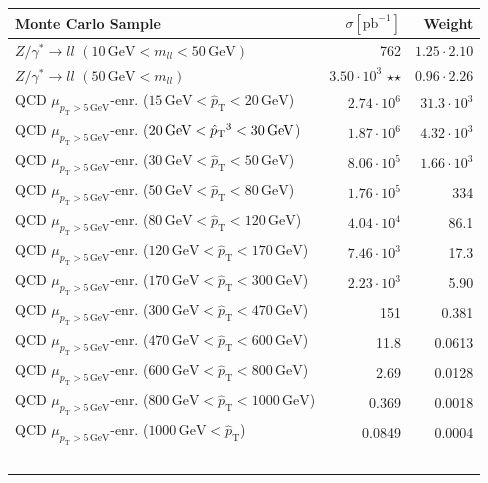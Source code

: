 \begin{table}[htbp!]
  \centering
  \begin{tabular}{|l|r|r|}
\hline
Monte Carlo Sample & $\sigma [\text{pb}^{-1}]$ & Weight \\
\hline
\hline
$Z/\gamma^* \rightarrow ll$ $(10\,\text{GeV} < m_{ll} < 50\,\text{GeV})$ & 762 & $1.25 \cdot 2.10$ \\
$Z/\gamma^* \rightarrow ll$ $(50\,\text{GeV} < m_{ll})$ & $3.50 \cdot 10^3$ $\star$$\star$ & $0.96 \cdot 2.26$ \\
\hline
QCD $\mu_{p_\text{T} > 5\,\text{GeV}}$-enr. ($15\,\text{GeV} < \hat{p}_{\text{T}} < 20\,\text{GeV}$) & $2.74 \cdot 10^6$ & $31.3 \cdot 10^3$ \\
QCD $\mu_{p_\text{T} > 5\,\text{GeV}}$-enr. ($20\,\text{GeV} < \hat{p}_{\text{T}}\footnotemark[3] < 30\,\text{GeV}$) & $1.87 \cdot 10^6$ & $4.32 \cdot 10^3$ \\
QCD $\mu_{p_\text{T} > 5\,\text{GeV}}$-enr. ($30\,\text{GeV} < \hat{p}_{\text{T}} < 50\,\text{GeV}$) & $8.06 \cdot 10^5$ & $1.66 \cdot 10^3$ \\
QCD $\mu_{p_\text{T} > 5\,\text{GeV}}$-enr. ($50\,\text{GeV} < \hat{p}_{\text{T}} < 80\,\text{GeV}$) & $1.76 \cdot 10^5$ & 334 \\
QCD $\mu_{p_\text{T} > 5\,\text{GeV}}$-enr. ($80\,\text{GeV} < \hat{p}_{\text{T}} < 120\,\text{GeV}$) & $4.04 \cdot 10^4$ & 86.1 \\
QCD $\mu_{p_\text{T} > 5\,\text{GeV}}$-enr. ($120\,\text{GeV} < \hat{p}_{\text{T}} < 170\,\text{GeV}$) & $7.46 \cdot 10^3$ & 17.3 \\
QCD $\mu_{p_\text{T} > 5\,\text{GeV}}$-enr. ($170\,\text{GeV} < \hat{p}_{\text{T}} < 300\,\text{GeV}$) & $2.23 \cdot 10^3$ & 5.90 \\
QCD $\mu_{p_\text{T} > 5\,\text{GeV}}$-enr. ($300\,\text{GeV} < \hat{p}_{\text{T}} < 470\,\text{GeV}$) & 151 & 0.381 \\
QCD $\mu_{p_\text{T} > 5\,\text{GeV}}$-enr. ($470\,\text{GeV} < \hat{p}_{\text{T}} < 600\,\text{GeV}$) & 11.8 & 0.0613 \\
QCD $\mu_{p_\text{T} > 5\,\text{GeV}}$-enr. ($600\,\text{GeV} < \hat{p}_{\text{T}} < 800\,\text{GeV}$) & 2.69 & 0.0128 \\
QCD $\mu_{p_\text{T} > 5\,\text{GeV}}$-enr. ($800\,\text{GeV} < \hat{p}_{\text{T}} < 1000\,\text{GeV}$) & 0.369 & 0.0018 \\
QCD $\mu_{p_\text{T} > 5\,\text{GeV}}$-enr. ($1000\,\text{GeV} < \hat{p}_{\text{T}}$) & 0.0849 & 0.0004 \\
$$
\end{tabular}
\end{table}
